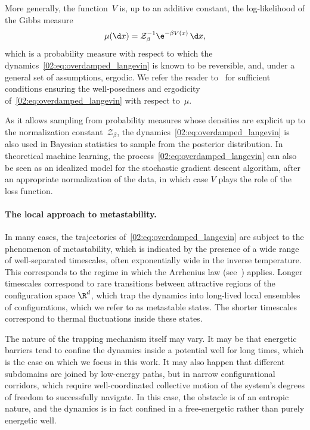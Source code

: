     More generally, the function~$V$ is, up to an additive constant, the log-likelihood of the Gibbs measure
    \begin{equation}
        \label{02:eq:gibbs_measure}\mu(\d x) = \mathcal Z_\beta^{-1}\e^{-\beta V(x)}\,\d x,
    \end{equation}
    which is a probability measure with respect to which the dynamics~\eqref{02:eq:overdamped_langevin} is known to be reversible, and, under a general set of assumptions, ergodic.
    We refer the reader to~\cite{RB06} for sufficient conditions ensuring the well-posedness and ergodicity of~\eqref{02:eq:overdamped_langevin} with respect to~$\mu$.

    As it allows sampling from probability measures whose densities are explicit up to the normalization constant~$\mathcal Z_\beta$, the dynamics~\eqref{02:eq:overdamped_langevin} is also used in Bayesian statistics to sample from the posterior distribution. In theoretical machine learning, the process~\eqref{02:eq:overdamped_langevin} can also be seen as an idealized model for the stochastic gradient descent algorithm, after an appropriate normalization of the data, in which case $V$ plays the role of the loss function.

    \paragraph{The local approach to metastability.}
    In many cases, the trajectories of~\eqref{02:eq:overdamped_langevin} are subject to the phenomenon of metastability, which is indicated by the presence of a wide range of well-separated timescales, often exponentially wide in the inverse temperature. This corresponds to the regime in which the Arrhenius law (see~\cite{A67}) applies.
    Longer timescales correspond to rare transitions between attractive regions of the configuration space $\R^d$, which trap the dynamics into long-lived local ensembles of configurations, which we refer to as metastable states. The shorter timescales correspond to thermal fluctuations inside these states.
    
    The nature of the trapping mechanism itself may vary. It may be that energetic barriers tend to confine the dynamics inside a potential well for long times, which is the case on which we focus in this work. It may also happen that different subdomains are joined by low-energy paths, but in narrow configurational corridors, which require well-coordinated collective motion of the system's degrees of freedom to successfully navigate.
    In this case, the obstacle is of an entropic nature, and the dynamics is in fact confined in a free-energetic rather than purely energetic well. 
    
